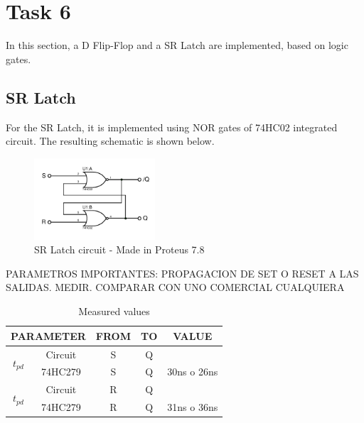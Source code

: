 
\usepackage{multirow}


\section*{Task 6}
In this section, a D Flip-Flop and a SR Latch
are implemented, based on logic gates.
\subsection*{SR Latch}
For the SR Latch, it is 
implemented using NOR gates of 74HC02 integrated
circuit. The resulting schematic is shown below.

\begin{figure}[H]
    \begin{centering}
    \includegraphics[width=0.4\textwidth]{latchSR}
    \par\end{centering}
    \caption{SR Latch circuit - Made in Proteus 7.8}
\end{figure}

PARAMETROS IMPORTANTES: PROPAGACION DE SET O 
RESET A LAS SALIDAS. MEDIR. COMPARAR CON UNO
COMERCIAL CUALQUIERA

\begin{table}[H]
    \begin{center}
        \begin{tabular}{|c|c|c|c|c|}
            \hline 
            \multicolumn{2}{|c|}{PARAMETER} & FROM & TO & VALUE\tabularnewline
            \hline 
            \hline 
            \multirow{2}{*}{$t_{pd}$} & Circuit & S & Q & \tabularnewline
            \cline{2-5} 
             & 74HC279 & S & Q & 30ns o 26ns\tabularnewline
            \hline 
            \multirow{2}{*}{$t_{pd}$} & Circuit & R & Q & \tabularnewline
            \cline{2-5} 
             & 74HC279 & R & Q & 31ns o 36ns\tabularnewline
            \hline 
            \end{tabular}
    \caption{Measured values}
    \end{center}
\end{table}

